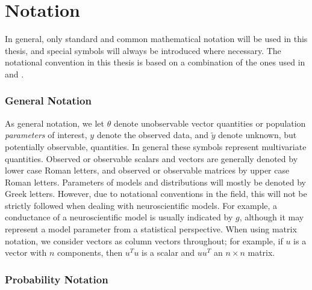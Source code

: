 \section{Notation}\label{sec:notation}

In general, only standard and common mathematical notation will be used in this thesis, and special symbols will always be introduced where necessary. The notational convention in this thesis is based on a combination of the ones used in \cite{BDA} and \cite{ABC_ch1}.

\subsubsection{General Notation}


As general notation, we let $\theta$ denote unobservable vector quantities or population \textit{parameters} of interest, $y$ denote the observed data, and $\tilde{y}$ denote unknown, but potentially observable, quantities. In general these symbols represent multivariate quantities. Observed or observable scalars and vectors are generally denoted by lower case Roman letters, and observed or observable matrices by upper case Roman letters. Parameters of models and distributions will mostly be denoted by Greek letters. However, due to notational conventions in the field, this will not be strictly followed when dealing with neuroscientific models. For example, a conductance of a neuroscientific model is usually indicated by $g$, although it may represent a model parameter from a statistical perspective. When using matrix notation, we consider vectors as column vectors throughout; for example, if $u$ is a vector with $n$ components, then $u^T u$ is a scalar and $uu^T$ an $n\times n$ matrix.


\subsubsection{Probability Notation}


